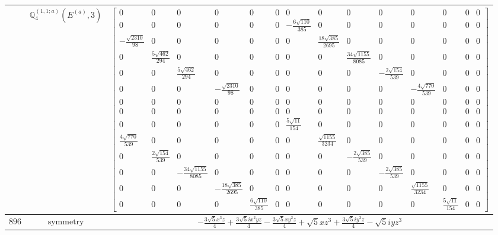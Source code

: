 \documentclass[fleqn,8pt,landscape]{jsarticle}
\begin{document}
\begin{longtable}{ccc}
$  $ & $ \mathbb{Q}_{4}^{(1,1;a)}(E^{(a)},3) $ & $ \begin{bmatrix} 0 & 0 & 0 & 0 & 0 & 0 & 0 & 0 & 0 & 0 & 0 & 0 & 0 & 0 \\ 0 & 0 & 0 & 0 & 0 & 0 & - \frac{6 \sqrt{110}}{385} & 0 & 0 & 0 & 0 & 0 & 0 & 0 \\ - \frac{\sqrt{2310}}{98} & 0 & 0 & 0 & 0 & 0 & 0 & \frac{18 \sqrt{385}}{2695} & 0 & 0 & 0 & 0 & 0 & 0 \\ 0 & \frac{5 \sqrt{462}}{294} & 0 & 0 & 0 & 0 & 0 & 0 & \frac{34 \sqrt{1155}}{8085} & 0 & 0 & 0 & 0 & 0 \\ 0 & 0 & \frac{5 \sqrt{462}}{294} & 0 & 0 & 0 & 0 & 0 & 0 & - \frac{2 \sqrt{154}}{539} & 0 & 0 & 0 & 0 \\ 0 & 0 & 0 & - \frac{\sqrt{2310}}{98} & 0 & 0 & 0 & 0 & 0 & 0 & - \frac{4 \sqrt{770}}{539} & 0 & 0 & 0 \\ 0 & 0 & 0 & 0 & 0 & 0 & 0 & 0 & 0 & 0 & 0 & 0 & 0 & 0 \\ 0 & 0 & 0 & 0 & 0 & 0 & 0 & 0 & 0 & 0 & 0 & 0 & 0 & 0 \\ 0 & 0 & 0 & 0 & 0 & 0 & \frac{5 \sqrt{11}}{154} & 0 & 0 & 0 & 0 & 0 & 0 & 0 \\ \frac{4 \sqrt{770}}{539} & 0 & 0 & 0 & 0 & 0 & 0 & \frac{\sqrt{1155}}{3234} & 0 & 0 & 0 & 0 & 0 & 0 \\ 0 & \frac{2 \sqrt{154}}{539} & 0 & 0 & 0 & 0 & 0 & 0 & - \frac{2 \sqrt{385}}{539} & 0 & 0 & 0 & 0 & 0 \\ 0 & 0 & - \frac{34 \sqrt{1155}}{8085} & 0 & 0 & 0 & 0 & 0 & 0 & - \frac{2 \sqrt{385}}{539} & 0 & 0 & 0 & 0 \\ 0 & 0 & 0 & - \frac{18 \sqrt{385}}{2695} & 0 & 0 & 0 & 0 & 0 & 0 & \frac{\sqrt{1155}}{3234} & 0 & 0 & 0 \\ 0 & 0 & 0 & 0 & \frac{6 \sqrt{110}}{385} & 0 & 0 & 0 & 0 & 0 & 0 & \frac{5 \sqrt{11}}{154} & 0 & 0 \end{bmatrix} $ \\ \hline
$ 896 $ & $ \text{symmetry} $ & $ - \frac{3 \sqrt{5} x^{3} z}{4} + \frac{3 \sqrt{5} i x^{2} y z}{4} - \frac{3 \sqrt{5} x y^{2} z}{4} + \sqrt{5} x z^{3} + \frac{3 \sqrt{5} i y^{3} z}{4} - \sqrt{5} i y z^{3} $ \\

\end{longtable}
\end{document}
